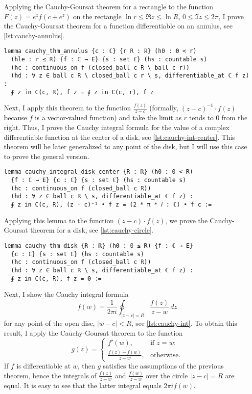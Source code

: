 \documentclass[a4paper, UKenglish,cleveref, autoref, thm-restate]{lipics-v2021}
\begin{document}
Applying the Cauchy-Goursat theorem for a rectangle to the function
\(F(z)=e^{z}f(c+e^{z})\) on the rectangle \(\ln r\le \Re z\le \ln R\),
\(0\le \Im z\le 2\pi\), I prove the Cauchy-Goursat theorem for a
function differentiable on an annulus, see \autoref{lst:cauchy-annulus}.

\begin{lstlisting}[caption=The Cauchy-Goursat theorem for an annulus,label=lst:cauchy-annulus]
lemma cauchy_thm_annulus {c : ℂ} {r R : ℝ} (h0 : 0 < r)
  (hle : r ≤ R) {f : ℂ → E} {s : set ℂ} (hs : countable s)
  (hc : continuous_on f (closed_ball c R \ ball c r))
  (hd : ∀ z ∈ ball c R \ closed_ball c r \ s, differentiable_at ℂ f z) :
  ∮ z in C(c, R), f z = ∮ z in C(c, r), f z
\end{lstlisting}

Next, I apply this theorem to the function \(\frac{f(z)}{z-c}\)
(formally, \((z-c)^{-1}\cdot f(z)\) because \(f\) is a vector-valued
function) and take the limit as \(r\) tends to \(0\) from the
right. Thus, I prove the Cauchy integral formula for the value of a
complex differentiable function at the center of a disk, see
\autoref{lst:cauchy-int-center}. This theorem will be later
generalized to any point of the disk, but I will use this case to
prove the general version.

\begin{lstlisting}[caption=Cauchy integral formula for the center of a disk,label=lst:cauchy-int-center]
lemma cauchy_integral_disk_center {R : ℝ} (h0 : 0 < R)
  {f : ℂ → E} {c : ℂ} {s : set ℂ} (hs : countable s)
  (hc : continuous_on f (closed_ball c R))
  (hd : ∀ z ∈ ball c R \ s, differentiable_at ℂ f z) :
  ∮ z in C(c, R), (z - c)⁻¹ • f z = (2 * π * 𝑖 : ℂ) • f c :=
\end{lstlisting}

Applying this lemma to the function \((z-c)\cdot f(z)\), we prove the
Cauchy-Goursat theorem for a disk, see \autoref{lst:cauchy-circle}.

\begin{lstlisting}[caption=The Cauchy-Goursat theorem for a disk,label=lst:cauchy-circle]
lemma cauchy_thm_disk {R : ℝ} (h0 : 0 ≤ R) {f : ℂ → E}
  {c : ℂ} {s : set ℂ} (hs : countable s)
  (hc : continuous_on f (closed_ball c R))
  (hd : ∀ z ∈ ball c R \ s, differentiable_at ℂ f z) :
  ∮ z in C(c, R), f z = 0 :=
\end{lstlisting}

Next, I show the Cauchy integral formula
\[
  f(w)=\frac{1}{2\pi i}\oint_{|z-c|=R}\frac{f(z)}{z-w}\,dz
\]
for any point of the open disc, \(|w-c|<R\), see
\autoref{lst:cauchy-int}. To obtain this result, I apply the
Cauchy-Goursat theorem to the function
\[
  g(z)=
  \begin{cases}
    f'(w),&\text{if }z=w;\\
    \frac{f(z)-f(w)}{z-w},&\text{otherwise}.
  \end{cases}
\]
If \(f\) is differentiable at \(w\), then \(g\) satisfies the
assumptions of the previous theorem, hence the integrals of
\(\frac{f(z)}{z-w}\) and \(\frac{f(w)}{z-w}\) over the circle
\(|z-c|=R\) are equal. It is easy to see that the latter integral
equals \(2\pi i f(w)\).
\end{document}

